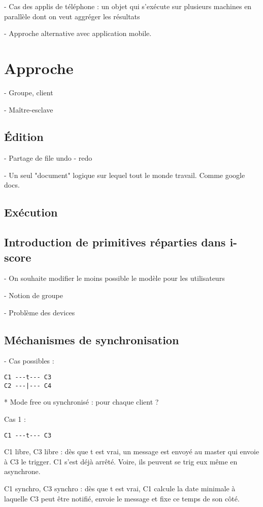 \documentclass{article}
\begin{document}
- Cas des applis de téléphone : un objet qui s'exécute sur plusieurs machines en parallèle dont on veut aggréger les résultats

- Approche alternative avec application mobile.

\section{Approche}
- Groupe, client

- Maître-esclave
\subsection{Édition}
- Partage de file undo - redo

- Un seul "document" logique sur lequel tout le monde travail. Comme google docs.

\subsection{Exécution}

\subsection{Introduction de primitives réparties dans i-score}
- On souhaite modifier le moins possible le modèle pour les utilisateurs

- Notion de groupe

- Problème des devices

\subsection{Méchanismes de synchronisation}
- Cas possibles : 

\begin{lstlisting}
C1 ---t--- C3
C2 ---|--- C4
\end{lstlisting}
* Mode free ou synchronisé : pour chaque client ? 

Cas 1 : 
\begin{lstlisting}
C1 ---t--- C3
\end{lstlisting}
C1 libre, C3 libre : dès que t est vrai, un message est envoyé au master qui envoie à C3 le trigger. C1 s'est déjà arrêté.
Voire, ils peuvent se trig eux même en asynchrone.

C1 synchro, C3 synchro : dès que t est vrai, C1 calcule la date minimale à laquelle C3 peut être notifié, envoie le message et fixe ce temps de son côté.
\end{document}
